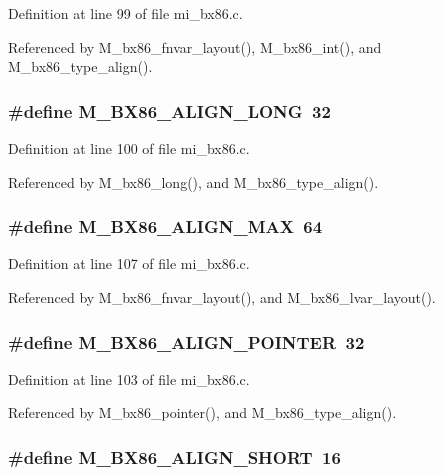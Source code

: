 Definition at line 99 of file mi\_\-bx86.c.

Referenced by M\_\-bx86\_\-fnvar\_\-layout(), M\_\-bx86\_\-int(), and M\_\-bx86\_\-type\_\-align().
\subsubsection{\setlength{\rightskip}{0pt plus 5cm}\#define M\_\-BX86\_\-ALIGN\_\-LONG~32}\label{mi__bx86_8c_e62ebd0d5e3ba27a477cab5d9768ce90}




Definition at line 100 of file mi\_\-bx86.c.

Referenced by M\_\-bx86\_\-long(), and M\_\-bx86\_\-type\_\-align().
\subsubsection{\setlength{\rightskip}{0pt plus 5cm}\#define M\_\-BX86\_\-ALIGN\_\-MAX~64}\label{mi__bx86_8c_e4bdfa2ce774788e9366f62a1a129b23}




Definition at line 107 of file mi\_\-bx86.c.

Referenced by M\_\-bx86\_\-fnvar\_\-layout(), and M\_\-bx86\_\-lvar\_\-layout().
\subsubsection{\setlength{\rightskip}{0pt plus 5cm}\#define M\_\-BX86\_\-ALIGN\_\-POINTER~32}\label{mi__bx86_8c_227096658aaa8117af742f7f49c5fc12}




Definition at line 103 of file mi\_\-bx86.c.

Referenced by M\_\-bx86\_\-pointer(), and M\_\-bx86\_\-type\_\-align().
\subsubsection{\setlength{\rightskip}{0pt plus 5cm}\#define M\_\-BX86\_\-ALIGN\_\-SHORT~16}\label{mi__bx86_8c_3ff7a09901317bae5c41856bca906d46}




